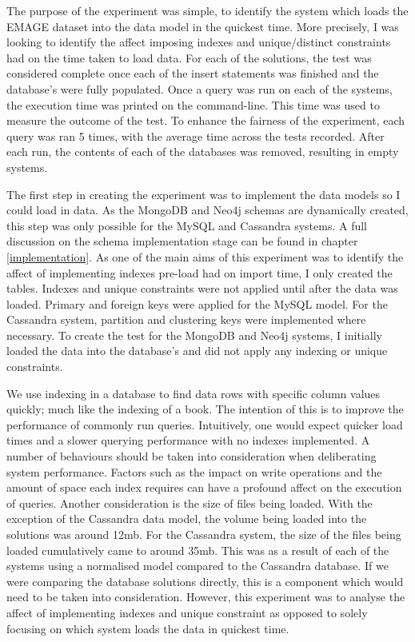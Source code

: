 The purpose of the experiment was simple, to identify the system which loads the EMAGE dataset into the data model in the quickest time. More precisely, I was looking to identify the affect imposing indexes and unique/distinct constraints had on the time taken to load data. For each of the solutions, the test was considered complete once each of the insert statements was finished and the database's were fully populated. Once a query was run on each of the systems, the execution time was printed on the command-line. This time was used to measure the outcome of the test. To enhance the fairness of the experiment, each query was ran 5 times, with the average time across the tests recorded. After each run, the contents of each of the databases was removed, resulting in empty systems.

The first step in creating the experiment was to implement the data models so I could load in data. As the MongoDB and Neo4j schemas are dynamically created, this step was only possible for the MySQL and Cassandra systems. A full discussion on the schema implementation stage can be found in chapter \ref{implementation}. As one of the main aims of this experiment was to identify the affect of implementing indexes pre-load had on import time, I only created the tables. Indexes and unique constraints were not applied until after the data was loaded. Primary and foreign keys were applied for the MySQL model. For the Cassandra system, partition and clustering keys were implemented where necessary. To create the test for the MongoDB and Neo4j systems, I initially loaded the data into the database's and did not apply any indexing or unique constraints.

We use indexing in a database to find data rows with specific column values quickly; much like the indexing of a book. The intention of this is to improve the performance of commonly run queries. Intuitively, one would expect quicker load times and a slower querying performance with no indexes implemented. A number of behaviours should be taken into consideration when deliberating system performance. Factors such as the impact on write operations and the amount of space each index requires can have a profound affect on the execution of queries. Another consideration is the size of files being loaded. With the exception of the Cassandra data model, the volume being loaded into the solutions was around 12mb. For the Cassandra system, the size of the files being loaded cumulatively came to around 35mb. This was as a result of each of the systems using a normalised model compared to the Cassandra database. If we were comparing the database solutions directly, this is a component which would need to be taken into consideration. However, this experiment was to analyse the affect of implementing indexes and unique constraint as opposed to solely focusing on which system loads the data in quickest time.

